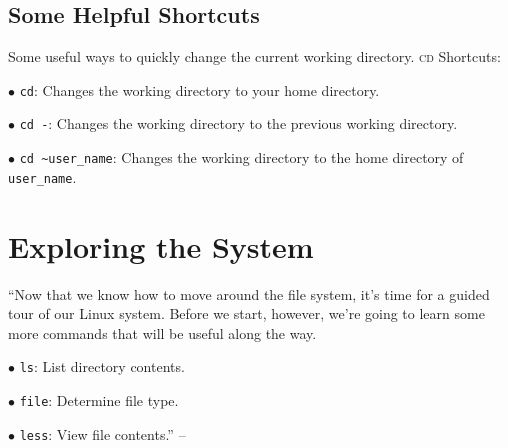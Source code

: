 \documentclass[oneside]{book}
\numberwithin{equation}{section}
\begin{document}
\subsection{Some Helpful Shortcuts}
Some useful ways to quickly change the current working directory. \textsc{cd} Shortcuts:
\begin{enumerate*}
	\item[$\bullet$] \texttt{cd}: Changes the working directory to your home directory.
	\item[$\bullet$] \texttt{cd -}: Changes the working directory to the previous working directory.
	\item[$\bullet$] \verb|cd ~user_name|: Changes the working directory to the home directory of \verb|user_name|.
\end{enumerate*}


\section{Exploring the System}
``Now that we know how to move around the file system, it's time for a guided tour of our Linux system. Before we start, however, we're going to learn some more commands that will be useful along the way.
\begin{enumerate*}
	\item[$\bullet$] \texttt{ls}: List directory contents.
	\item[$\bullet$] \texttt{file}: Determine file type.
	\item[$\bullet$] \texttt{less}: View file contents.'' -- \cite[p. 50]{Shotts2019}
\end{enumerate*}
\end{document}
